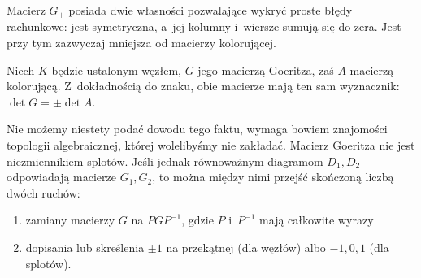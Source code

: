 Macierz $G_+$ posiada dwie własności pozwalające wykryć proste błędy rachunkowe: jest symetryczna, a~jej kolumny i~wiersze sumują się do zera.
Jest przy tym zazwyczaj mniejsza od macierzy kolorującej.

\begin{proposition}
    Niech $K$ będzie ustalonym węzłem, $G$ jego macierzą Goeritza, zaś $A$ macierzą kolorującą.
    Z~dokładnością do znaku, obie macierze mają ten sam wyznacznik: $\det G = \pm \det A$.
\end{proposition}

Nie możemy niestety podać dowodu tego faktu, wymaga bowiem znajomości topologii algebraicznej, której wolelibyśmy nie zakładać.
Macierz Goeritza nie jest niezmiennikiem splotów.
Jeśli jednak równoważnym diagramom $D_1, D_2$ odpowiadają macierze $G_1, G_2$, to można między nimi przejść skończoną liczbą dwóch ruchów:
\begin{enumerate}[leftmargin=*]
\itemsep0em
    \item zamiany macierzy $G$ na $PGP^{-1}$, gdzie $P$ i~$P^{-1}$ mają całkowite wyrazy
    \item dopisania lub skreślenia $\pm 1$ na przekątnej (dla węzłów) albo $-1, 0, 1$ (dla splotów).
\end{enumerate}




